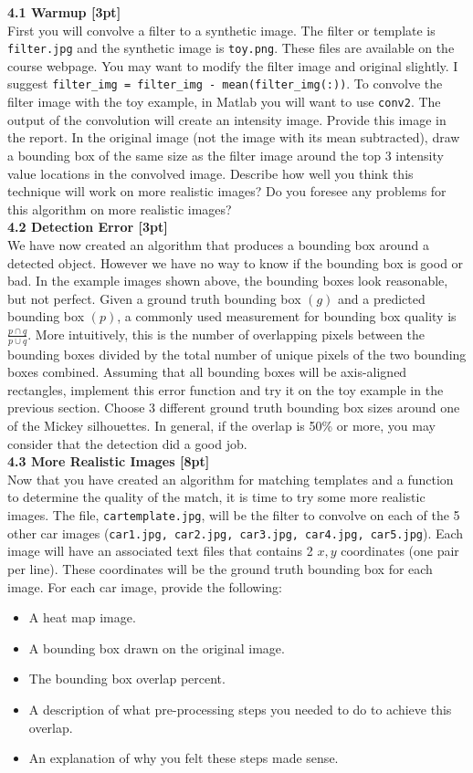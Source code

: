 \documentclass{assignment}
\begin{document}
\begin{problemlist}
\textbf{4.1 Warmup [3pt]}\\
First you will convolve a filter to a synthetic image. The filter or template is \texttt{filter.jpg} and the synthetic image is \texttt{toy.png}. These files are available on the course webpage. You may want to modify the filter image and original slightly. I suggest \texttt{filter\_img = filter\_img - mean(filter\_img(:))}. To convolve the filter image with the toy example, in Matlab you will want to use \texttt{conv2}. The output of the convolution will create an intensity image. Provide this image in the report. In the original image (not the image with its mean subtracted), draw a bounding box of the same size as the filter image around the top 3 intensity value locations in the convolved image. Describe how well you think this technique will work on more realistic images? Do you foresee any problems for this algorithm on more realistic images?\\

\textbf{4.2 Detection Error [3pt]}\\
We have now created an algorithm that produces a bounding box around a detected object. However we have no way to know if the bounding box is good or bad. In the example images shown above, the bounding boxes look reasonable, but not perfect. Given a ground truth bounding box $(g)$ and a predicted bounding box $(p)$, a commonly used measurement for bounding box quality is $\frac{p\cap q}{p\cup q}$. More intuitively, this is the number of overlapping pixels between the bounding boxes divided by the total number of unique pixels of the two bounding boxes combined. Assuming that all bounding boxes will be axis-aligned rectangles, implement this error function and try it on the toy example in the previous section. Choose 3 different ground truth bounding box sizes around one of the Mickey silhouettes. In general, if the overlap is 50\% or more, you may consider that the detection did a good job.\\

\textbf{4.3 More Realistic Images [8pt]}\\
Now that you have created an algorithm for matching templates and a function to determine the quality of the match, it is time to try some more realistic images. The file, \texttt{cartemplate.jpg}, will be the filter to convolve on each of the 5 other car images (\texttt{car1.jpg, car2.jpg, car3.jpg, car4.jpg, car5.jpg}). Each image will have an associated text files that contains 2 $x, y$ coordinates (one pair per line). These coordinates will be the ground truth bounding box for each image. For each car image, provide the following:
\begin{itemize}
    \item A heat map image.
    \item A bounding box drawn on the original image.
    \item The bounding box overlap percent.
    \item A description of what pre-processing steps you needed to do to achieve this overlap.
    \item An explanation of why you felt these steps made sense.
\end{itemize}


\end{problemlist}
\end{document}
